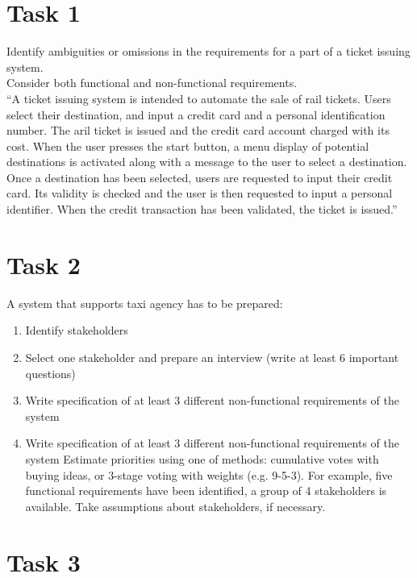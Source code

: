 \documentclass[12pt]{article}
\begin{document}
\section{Task 1}
Identify ambiguities or omissions in the requirements for a part of a ticket issuing system.  \\ Consider both functional and non-functional requirements.  \\ 
“A ticket issuing system is intended to automate the sale of rail tickets. Users select their destination, and input a credit card and a personal identification number. The aril ticket is issued and the credit card account charged with its cost. When the user presses the start button, a menu display of potential destinations is activated along with a message to the user to select a destination. Once a destination has been selected, users are requested to input their credit card. Its validity is checked and the user is then requested to input a personal identifier. When the credit transaction has been validated, the ticket is issued.”  


\section{Task 2}

A system that supports taxi agency has to be prepared: 

\begin{enumerate}[label=\Alph*)]
\item Identify stakeholders 

\item  Select one stakeholder and prepare an interview (write at least 6 important questions) 

\item Write specification of at least 3 different non-functional requirements of the system 

\item Write specification of at least 3 different non-functional requirements of the system 
 Estimate priorities using one of methods: cumulative votes with buying ideas, or 3-stage voting with weights (e.g. 9-5-3). For example, five functional requirements have been identified, a group of 4 stakeholders is available. Take assumptions about stakeholders, if necessary. 
\end{enumerate}


\section{Task 3}
\end{document}
